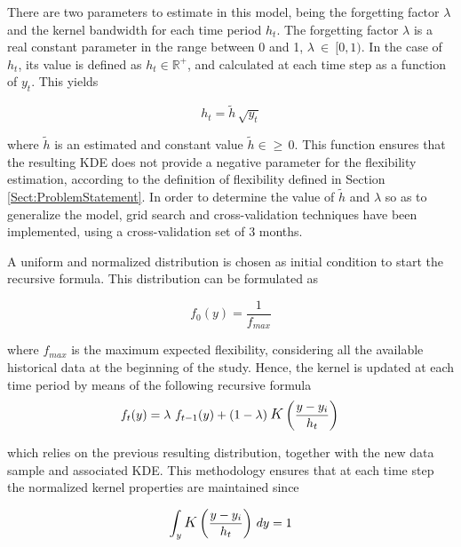 There are two parameters to estimate in this model, being the forgetting factor $\lambda$ and the kernel bandwidth for each time period $h_{t}$. The forgetting factor $\lambda$ is a real constant parameter in the range between 0 and 1, $\lambda\ \in\ [0,1)$. In the case of $h_{t}$, its value is defined as $h_{t} \in \mathbb{R}^+$, and calculated at each time step as a function of $y_{t}$. This yields 


\begin{equation} \label{eq:ht}
    h_{t} = \widetilde{h} \, \sqrt{y_{t}}
\end{equation}

where $\widetilde{h}$ is an estimated and constant value $\widetilde{h} \in \mathbb \geqslant \, 0$. This function ensures that the resulting KDE does not provide a negative parameter for the flexibility estimation, according to the definition of flexibility defined in Section \ref{Sect:ProblemStatement}. In order to determine the value of $\widetilde{h}$ and $\lambda$ so as to generalize the model, grid search and cross-validation techniques have been implemented, using a cross-validation set of 3 months.

A uniform and normalized distribution is chosen as initial condition to start the recursive formula. This distribution can be formulated as 

\begin{equation}
    f_{0}(y) = \frac{1}{f_{max}}
\end{equation}

where $f_{max}$ is the maximum expected flexibility, considering all the available historical data at the beginning of the study. Hence, the kernel is updated at each time period by means of the following recursive formula 
\begin{equation} \label{eq:recursive_formula}
    f_{t}(y) = \lambda\ f_{t-1}(y) + (1-\lambda) \: \mathlarger{K}\left(\frac{y - y_{i}}{h_{t}}\right) \\
\end{equation}

which relies on the previous resulting distribution, together with the new data sample and associated KDE. This methodology ensures that at each time step the normalized kernel properties are maintained since

\begin{equation}
  \int_{y} \mathlarger{K}\left(\frac{y - y_{i}}{h_{t}}\right) \, dy = 1 \\  
\end{equation}


